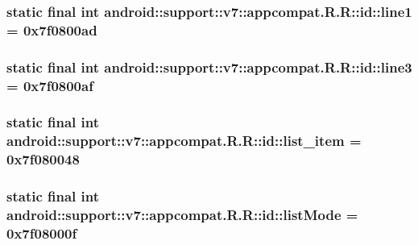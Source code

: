 \hypertarget{classandroid_1_1support_1_1v7_1_1appcompat_1_1_r_1_1id_c54b2e3ef8366248d7cd49df5c102a38}{
\subsubsection[{line1}]{\setlength{\rightskip}{0pt plus 5cm}static final int android::support::v7::appcompat.R.R::id::line1 = 0x7f0800ad}}
\label{classandroid_1_1support_1_1v7_1_1appcompat_1_1_r_1_1id_c54b2e3ef8366248d7cd49df5c102a38}


\hypertarget{classandroid_1_1support_1_1v7_1_1appcompat_1_1_r_1_1id_dea1e8cef6c0a83b898df765940ca050}{
\subsubsection[{line3}]{\setlength{\rightskip}{0pt plus 5cm}static final int android::support::v7::appcompat.R.R::id::line3 = 0x7f0800af}}
\label{classandroid_1_1support_1_1v7_1_1appcompat_1_1_r_1_1id_dea1e8cef6c0a83b898df765940ca050}


\hypertarget{classandroid_1_1support_1_1v7_1_1appcompat_1_1_r_1_1id_ff33bf6ce676c4362d112e08994cb96d}{
\subsubsection[{list\_\-item}]{\setlength{\rightskip}{0pt plus 5cm}static final int android::support::v7::appcompat.R.R::id::list\_\-item = 0x7f080048}}
\label{classandroid_1_1support_1_1v7_1_1appcompat_1_1_r_1_1id_ff33bf6ce676c4362d112e08994cb96d}


\hypertarget{classandroid_1_1support_1_1v7_1_1appcompat_1_1_r_1_1id_ac73de7caec4bd42aa5dec4f996d16f5}{
\subsubsection[{listMode}]{\setlength{\rightskip}{0pt plus 5cm}static final int android::support::v7::appcompat.R.R::id::listMode = 0x7f08000f}}
\label{classandroid_1_1support_1_1v7_1_1appcompat_1_1_r_1_1id_ac73de7caec4bd42aa5dec4f996d16f5}


